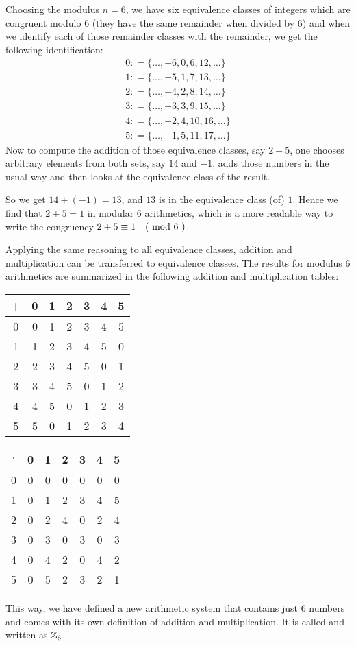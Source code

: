 \begin{example} 
\label{def_residue_ring_z_6}
Choosing the modulus $ n = 6 $, we have six equivalence classes of integers which are congruent modulo $ 6 $ (they have the same remainder when divided by $6$) and when we identify each of those remainder classes with the remainder, we get the following identification:
$$
\begin{array}{l}
0: = \{\ldots, -6,0,6,12, \ldots \}\\
1: = \{\ldots, -5,1,7,13, \ldots \}\\
2: = \{\ldots, -4,2,8,14, \ldots \} \\
3: = \{\ldots, -3,3,9,15, \ldots \}\\
4: = \{\ldots, -2,4,10,16, \ldots \}\\
5: = \{\ldots, -1,5,11,17, \ldots \}
\end{array}
$$
Now to compute the addition of those equivalence classes, say $2+5$, one chooses arbitrary elements from both sets, say $14$ and $-1$, adds those numbers in the usual way and then looks at the equivalence class of the result. 

So we get $14+(-1)=13$, and $13$ is in the equivalence class (of) $1$. Hence we find that $2+5=1$ in modular $6$ arithmetics, which is a more readable way to write the congruency $2+5 \equiv 1 \quad \text{( mod } 6 \text{ )}$.

Applying the same reasoning to all equivalence classes, addition and multiplication can  be transferred to  equivalence classes. The results for modulus $6$ arithmetics are summarized in the following addition and multiplication tables:
\begin{center}
  \begin{tabular}{c | c c c c c c}
    + & 0 & 1 & 2 & 3 & 4 & 5\\\hline
    0 & 0 & 1 & 2 & 3 & 4 & 5 \\
    1 & 1 & 2 & 3 & 4 & 5 & 0\\
    2 & 2 & 3 & 4 & 5 & 0 & 1\\
    3 & 3 & 4 & 5 & 0 & 1 & 2\\
    4 & 4 & 5 & 0 & 1 & 2 & 3\\
    5 & 5 & 0 & 1 & 2 & 3 & 4
  \end{tabular} \quad \quad \quad \quad
  \begin{tabular}{c | c c c c c c}
$ \cdot $ & 0 & 1 & 2 & 3 & 4 & 5 \\\hline
        0 & 0 & 0 & 0 & 0 & 0 & 0\\
        1 & 0 & 1 & 2 & 3 & 4 & 5\\
        2 & 0 & 2 & 4 & 0 & 2 & 4\\
        3 & 0 & 3 & 0 & 3 & 0 & 3\\
        4 & 0 & 4 & 2 & 0 & 4 & 2\\
        5 & 0 & 5 & 2 & 3 & 2 & 1
  \end{tabular}
\end{center}
This way, we have defined a new arithmetic system that contains just $6$ numbers and comes with its own definition of addition and multiplication. It is called  and written as $\mathbb{Z}_6$.


\end{example}
